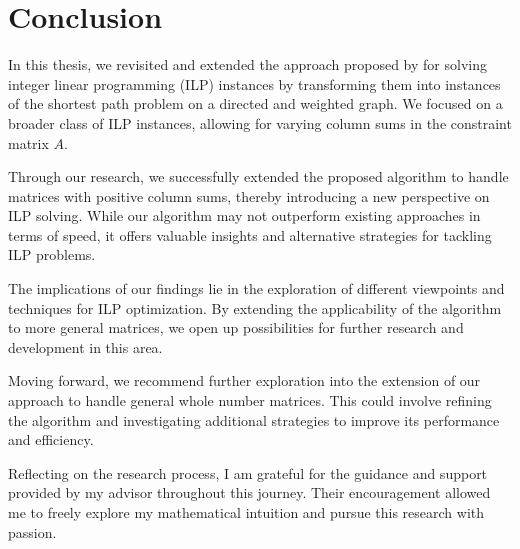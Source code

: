 \chapter{Conclusion}
In this thesis, we revisited and extended the approach proposed by \cite{algebraic_statistics} for solving integer linear programming (ILP) instances by transforming them into instances of the shortest path problem on a directed and weighted graph. We focused on a broader class of ILP instances, allowing for varying column sums in the constraint matrix $A$.

Through our research, we successfully extended the proposed algorithm to handle matrices with positive column sums, thereby introducing a new perspective on ILP solving. While our algorithm may not outperform existing approaches in terms of speed, it offers valuable insights and alternative strategies for tackling ILP problems.

The implications of our findings lie in the exploration of different viewpoints and techniques for ILP optimization. By extending the applicability of the algorithm to more general matrices, we open up possibilities for further research and development in this area.

Moving forward, we recommend further exploration into the extension of our approach to handle general whole number matrices. This could involve refining the algorithm and investigating additional strategies to improve its performance and efficiency.

Reflecting on the research process, I am grateful for the guidance and support provided by my advisor throughout this journey. Their encouragement allowed me to freely explore my mathematical intuition and pursue this research with passion.

